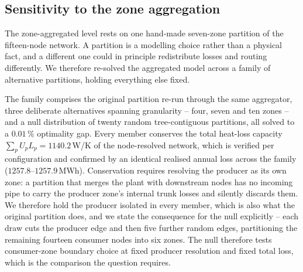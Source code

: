 
\subsection{Sensitivity to the zone aggregation}
\label{subsec:clustering}

The zone-aggregated level rests on one hand-made seven-zone partition of the fifteen-node
network. A partition is a modelling choice rather than a physical fact, and a different one
could in principle redistribute losses and routing differently. We therefore re-solved the
aggregated model across a family of alternative partitions, holding everything else fixed.

The family comprises the original partition re-run through the same aggregator, three
deliberate alternatives spanning granularity -- four, seven and ten zones -- and a null
distribution of twenty random tree-contiguous partitions, all solved to a $0.01$\,\%
optimality gap. Every member conserves the total heat-loss capacity
$\sum_p U_p L_p = 1140.2$\,W/K of the node-resolved network, which is verified per
configuration and confirmed by an identical realised annual loss across the family
($1257.8$--$1257.9$\,MWh). Conservation requires resolving the producer as its own zone: a
partition that merges the plant with downstream nodes has no incoming pipe to carry the
producer zone's internal trunk losses and silently discards them. We therefore hold the
producer isolated in every member, which is also what the original partition does, and we
state the consequence for the null explicitly -- each draw cuts the producer edge and then
five further random edges, partitioning the remaining fourteen consumer nodes into six
zones. The null therefore tests consumer-zone boundary choice at fixed producer resolution
and fixed total loss, which is the comparison the question requires.

